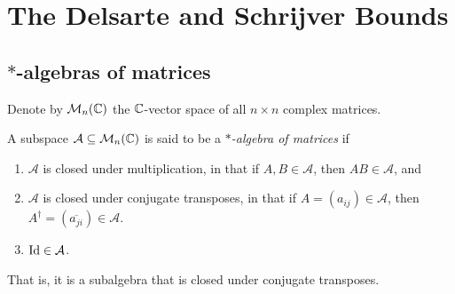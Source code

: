 
\section{The Delsarte and Schrijver Bounds}

\subsection{$*$-algebras of matrices}

	Denote by $\mathcal{M}_n(\mathbb{C})$ the $\mathbb{C}$-vector space of all $n \times n$ complex matrices.

	\begin{fdef}
		A subspace $\mathcal{A} \subseteq \mathcal{M}_n(\mathbb{C})$ is said to be a \emph{$*$-algebra of matrices} if
		\begin{enumerate}
			\item $\mathcal{A}$ is closed under multiplication, in that if $A,B \in \mathcal{A}$, then $AB \in \mathcal{A}$, and
			\item $\mathcal{A}$ is closed under conjugate transposes, in that if $A = (a_{ij}) \in \mathcal{A}$, then $A^\dagger = (\overline{a_{ji}}) \in \mathcal{A}$.
			\item $\operatorname{Id} \in \mathcal{A}$.
		\end{enumerate}
	\end{fdef}

	That is, it is a subalgebra that is closed under conjugate transposes.


